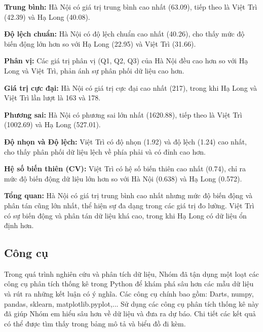 \textbf{Trung bình:} Hà Nội có giá trị trung bình cao nhất (63.09), tiếp theo là Việt Trì (42.39) và Hạ Long (40.08).

\textbf{Độ lệch chuẩn:} Hà Nội có độ lệch chuẩn cao nhất (40.26), cho thấy mức độ biến động lớn hơn so với Hạ Long (22.95) và Việt Trì (31.66).

\textbf{Phân vị:} Các giá trị phân vị (Q1, Q2, Q3) của Hà Nội đều cao hơn so với Hạ Long và Việt Trì, phản ánh sự phân phối dữ liệu cao hơn.

\textbf{Giá trị cực đại:} Hà Nội có giá trị cực đại cao nhất (217), trong khi Hạ Long và Việt Trì lần lượt là 163 và 178.

\textbf{Phương sai:} Hà Nội có phương sai lớn nhất (1620.88), tiếp theo là Việt Trì (1002.69) và Hạ Long (527.01).

\textbf{Độ nhọn và Độ lệch:} Việt Trì có độ nhọn (1.92) và độ lệch (1.24) cao nhất, cho thấy phân phối dữ liệu lệch về phía phải và có đỉnh cao hơn.

\textbf{Hệ số biến thiên (CV):} Việt Trì có hệ số biến thiên cao nhất (0.74), chỉ ra mức độ biến động dữ liệu lớn hơn so với Hà Nội (0.638) và Hạ Long (0.572).

\textbf{Tổng quan:} Hà Nội có giá trị trung bình cao nhất nhưng mức độ biến động và phân tán cũng lớn nhất, thể hiện sự đa dạng trong các giá trị đo lường. Việt Trì có sự biến động và phân tán dữ liệu khá cao, trong khi Hạ Long có dữ liệu ổn định hơn.


\subsection{Công cụ}
Trong quá trình nghiên cứu và phân tích dữ liệu, Nhóm đã tận dụng một loạt các công cụ phân tích thống kê trong Python để khám phá sâu hơn các mẫu dữ liệu và rút ra những kết luận có ý nghĩa. Các công cụ chính bao gồm: Darts, numpy, pandas, sklearn, matplotlib.pyplot,... Sử dụng các công cụ phân tích thống kê này đã giúp Nhóm em hiểu sâu hơn về dữ liệu và đưa ra dự báo. Chi tiết các kết quả có thể được tìm thấy trong bảng mô tả và biểu đồ đi kèm. 

